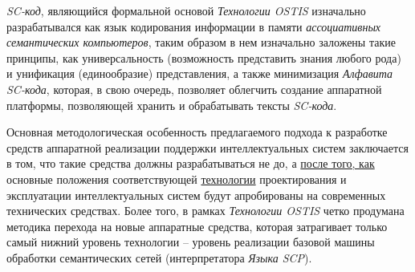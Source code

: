 \textit{SC-код}, являющийся формальной основой \textit{Технологии OSTIS} изначально разрабатывался как язык кодирования информации в памяти \textit{ассоциативных семантических компьютеров}, таким образом в нем изначально заложены такие принципы, как универсальность (возможность представить знания любого рода) и унификация (единообразие) представления, а также минимизация \textit{Алфавита SC-кода}, которая, в свою очередь, позволяет облегчить создание аппаратной платформы, позволяющей хранить и обрабатывать тексты \textit{SC-кода}.

Основная методологическая особенность предлагаемого подхода к разработке средств аппаратной реализации поддержки интеллектуальных систем заключается в том, что такие средства должны разрабатываться не до, а \underline{после того, как} основные положения соответствующей \underline{технологии} проектирования и эксплуатации интеллектуальных систем будут апробированы на современных технических средствах. Более того, в рамках \textit{\textit{Технологии OSTIS}} четко продумана методика перехода на новые аппаратные средства, которая затрагивает только самый нижний уровень технологии -- уровень реализации базовой машины обработки семантических сетей (интерпретатора \textit{Языка SCP}).

